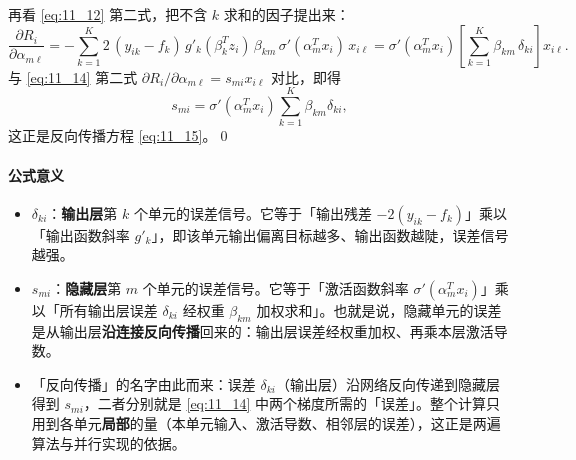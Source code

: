 再看 \ref{eq:11_12} 第二式，把不含 $k$ 求和的因子提出来：
\[
\frac{\partial R_i}{\partial \alpha_{m\ell}}
= - \sum_{k=1}^{K} 2\,(y_{ik}-f_k)\, g'_k(\beta_k^T z_i)\, \beta_{km}\, \sigma'(\alpha_m^T x_i)\, x_{i\ell}
= \sigma'(\alpha_m^T x_i) \left[ \sum_{k=1}^{K} \beta_{km}\, \delta_{ki} \right] x_{i\ell}.
\]
与 \ref{eq:11_14} 第二式 $\partial R_i/\partial \alpha_{m\ell} = s_{mi} x_{i\ell}$ 对比，即得
\[
s_{mi} = \sigma'(\alpha_m^T x_i) \sum_{k=1}^{K} \beta_{km} \delta_{ki},
\]
这正是反向传播方程 \ref{eq:11_15}。\qed

\paragraph{公式意义}

\begin{itemize}
\item $\delta_{ki}$：\textbf{输出层}第 $k$ 个单元的误差信号。它等于「输出残差 $-2(y_{ik}-f_k)$」乘以「输出函数斜率 $g'_k$」，即该单元输出偏离目标越多、输出函数越陡，误差信号越强。
\item $s_{mi}$：\textbf{隐藏层}第 $m$ 个单元的误差信号。它等于「激活函数斜率 $\sigma'(\alpha_m^T x_i)$」乘以「所有输出层误差 $\delta_{ki}$ 经权重 $\beta_{km}$ 加权求和」。也就是说，隐藏单元的误差是从输出层\textbf{沿连接反向传播}回来的：输出层误差经权重加权、再乘本层激活导数。
\item 「反向传播」的名字由此而来：误差 $\delta_{ki}$（输出层）沿网络反向传递到隐藏层得到 $s_{mi}$，二者分别就是 \ref{eq:11_14} 中两个梯度所需的「误差」。整个计算只用到各单元\textbf{局部}的量（本单元输入、激活导数、相邻层的误差），这正是两遍算法与并行实现的依据。
\end{itemize}

